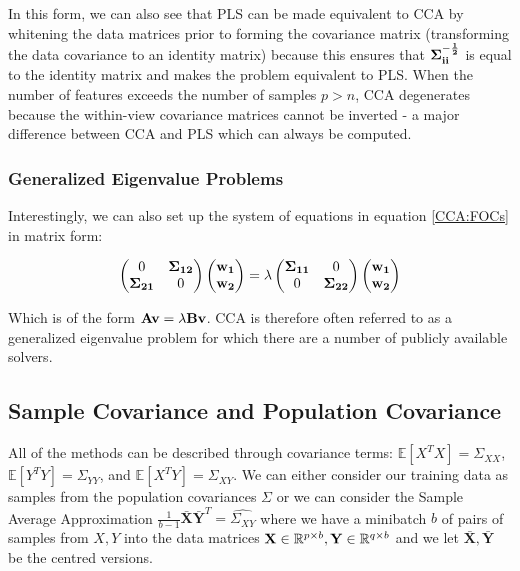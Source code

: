 In this form, we can also see that PLS can be made equivalent to CCA by whitening the data matrices prior to forming the covariance matrix (transforming the data covariance to an identity matrix) because this ensures that $\bold{\Sigma^{-\frac{1}{2}}_{ii}}$ is equal to the identity matrix and makes the problem equivalent to PLS. When the number of features exceeds the number of samples $p>n$, CCA degenerates because the within-view covariance matrices cannot be inverted - a major difference between CCA and PLS which can always be computed.

\subsubsection{Generalized Eigenvalue Problems}

Interestingly, we can also set up the system of equations in equation \ref{CCA:FOCs} in matrix form:

\begin{align}
    \begin{pmatrix}
        0                  & \bold{\Sigma_{12}} \\
        \bold{\Sigma_{21}} & 0
    \end{pmatrix}
    \begin{pmatrix}
        \bold{w_1} \\
        \bold{w_2}
    \end{pmatrix}
    =
    \lambda
    \begin{pmatrix}
        \bold{\Sigma_{11}} & 0                  \\
        0                  & \bold{\Sigma_{22}}
    \end{pmatrix}
    \begin{pmatrix}
        \bold{w_1} \\
        \bold{w_2}
    \end{pmatrix}
\end{align}

Which is of the form $\bold{A v} = \lambda \bold{B v}$. CCA is therefore often referred to as a generalized eigenvalue problem for which there are a number of publicly available solvers.

\subsection{Sample Covariance and Population Covariance}
All of the methods can be described through covariance terms: $\mathbb{E}[X^TX]=\Sigma_{XX}$, $\mathbb{E}[Y^TY]=\Sigma_{YY}$, and $\mathbb{E}[X^TY]=\Sigma_{XY}$. We can either consider our training data as samples from the population covariances $\Sigma$ or we can consider the Sample Average Approximation $\frac{1}{b-1}\bar{\mathbf{X}} \bar{\mathbf{Y}}^T=\hat{\Sigma_{XY}}$ where we have a minibatch $b$ of pairs of samples from $X,Y$ into the data matrices $\mathbf{X} \in \mathbb{R}^{p \times b}, \mathbf{Y} \in \mathbb{R}^{q \times b}$ and we let $\bar{\mathbf{X}},\bar{\mathbf{Y}}$ be the centred versions.

